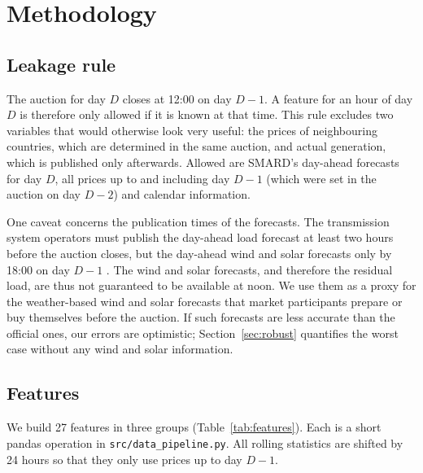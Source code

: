 \documentclass[12pt,oneside]{article}
\begin{document}
\section{Methodology} \label{sec:method}

\subsection{Leakage rule} \label{sec:leakage}

The auction for day $D$ closes at 12:00 on day $D-1$. A feature for an hour of day $D$ is therefore only allowed if it is known at that time. This rule excludes two variables that would otherwise look very useful: the prices of neighbouring countries, which are determined in the same auction, and actual generation, which is published only afterwards. Allowed are SMARD's day-ahead forecasts for day $D$, all prices up to and including day $D-1$ (which were set in the auction on day $D-2$) and calendar information.

One caveat concerns the publication times of the forecasts. The transmission system operators must publish the day-ahead load forecast at least two hours before the auction closes, but the day-ahead wind and solar forecasts only by 18:00 on day $D-1$ \citep{eu2013transparency}. The wind and solar forecasts, and therefore the residual load, are thus not guaranteed to be available at noon. We use them as a proxy for the weather-based wind and solar forecasts that market participants prepare or buy themselves before the auction. If such forecasts are less accurate than the official ones, our errors are optimistic; Section~\ref{sec:robust} quantifies the worst case without any wind and solar information.

\subsection{Features}

We build 27 features in three groups (Table~\ref{tab:features}). Each is a short pandas operation in \texttt{src/\allowbreak data\_\allowbreak pipeline.py}. All rolling statistics are shifted by 24 hours so that they only use prices up to day $D-1$.
\end{document}
